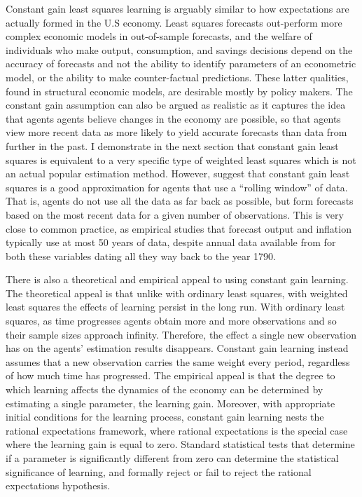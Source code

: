 Constant gain least squares learning is arguably similar to how expectations are actually formed in the U.S economy.  Least squares forecasts out-perform more complex economic models in out-of-sample forecasts, and the welfare of individuals who make output, consumption, and savings decisions depend on the accuracy of forecasts and not the ability to identify parameters of an econometric model, or the ability to make counter-factual predictions.  These latter qualities, found in structural economic models, are desirable mostly by policy makers.  The constant gain assumption can also be argued as realistic as it captures the idea that agents agents believe changes in the economy are possible, so that agents view more recent data as more likely to yield accurate forecasts than data from further in the past.  I demonstrate in the next section that constant gain least squares is equivalent to a very specific type of weighted least squares which is not an actual popular estimation method.  However,  suggest that constant gain least squares is a good approximation for agents that use a ``rolling window'' of data.  That is, agents do not use all the data as far back as possible, but form forecasts based on the most recent data for a given number of observations.  This is very close to common practice, as empirical studies that forecast output and inflation typically use at most 50 years of data, despite annual data available from  for both these variables dating all they way back to the year 1790.

There is also a theoretical and empirical appeal to using constant gain learning.  The theoretical appeal is that unlike with ordinary least squares, with weighted least squares the effects of learning persist in the long run.  With ordinary least squares, as time progresses agents obtain more and more observations and so their sample sizes approach infinity.  Therefore, the effect a single new observation has on the agents' estimation results disappears.  Constant gain learning instead assumes that a new observation carries the same weight every period, regardless of how much time has progressed.  The empirical appeal is that the degree to which learning affects the dynamics of the economy can be determined by estimating a single parameter, the learning gain.  Moreover, with appropriate initial conditions for the learning process, constant gain learning nests the rational expectations framework, where rational expectations is the special case where the learning gain is equal to zero.  Standard statistical tests that determine if a parameter is significantly different from zero can determine the statistical significance of learning, and formally reject or fail to reject the rational expectations hypothesis.

